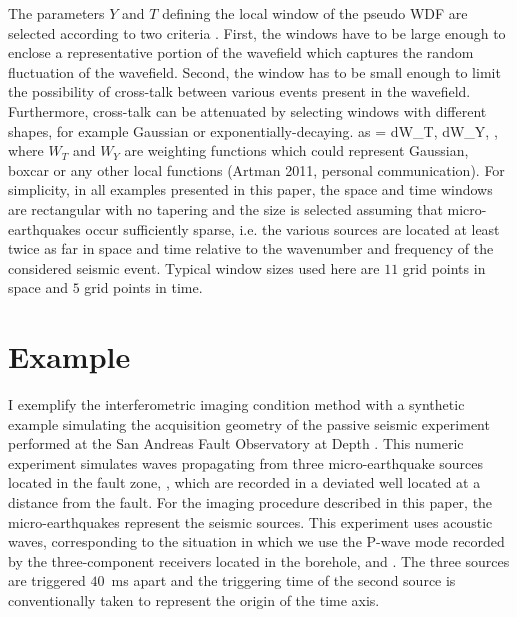 The parameters $Y$ and $T$ defining the local window of the pseudo WDF
are selected according to two criteria \cite[]{Cohen.tfa.1995}. First,
the windows have to be large enough to enclose a representative
portion of the wavefield which captures the random fluctuation of the
wavefield. Second, the window has to be small enough to limit the
possibility of cross-talk between various events present in the
wavefield. Furthermore, cross-talk can be attenuated by selecting
windows with different shapes, for example Gaussian or
exponentially-decaying.     as
%
\beq \label{eqn:wdfgeneral}
\WA{}{\ym,\tm} = 
\int d\th W_T\lp \tm,\th \rp
\int d\yh W_Y\lp \ym,\yh \rp
{}
 \;,
\eeq
%
where $W_T$ and $W_Y$ are weighting functions which could represent
Gaussian, boxcar or any other local functions (Artman 2011, personal
communication).  For simplicity, in all examples presented in this
paper, the space and time windows are rectangular with no tapering and
the size is selected assuming that micro-earthquakes occur
sufficiently sparse, i.e. the various sources are located at least
twice as far in space and time relative to the wavenumber and
frequency of the considered seismic event. Typical window sizes used
here are $11$ grid points in space and $5$ grid points in
time. 

\section{Example}


I exemplify the interferometric imaging condition method with a
synthetic example simulating the acquisition geometry of the passive
seismic experiment performed at the San Andreas Fault Observatory at
Depth \cite[]{Chavaria:2003,VasconcelosEtAl.eos.safod}. This numeric
experiment simulates waves propagating from three micro-earthquake
sources located in the fault zone, , which are recorded in a
deviated well located at a distance from the fault. For the imaging
procedure described in this paper, the micro-earthquakes represent the
seismic sources. This experiment uses acoustic waves, corresponding to
the situation in which we use the P-wave mode recorded by the
three-component receivers located in the borehole, 
and . The three sources are triggered $40$~ms apart and
the triggering time of the second source is conventionally taken to
represent the origin of the time axis.

